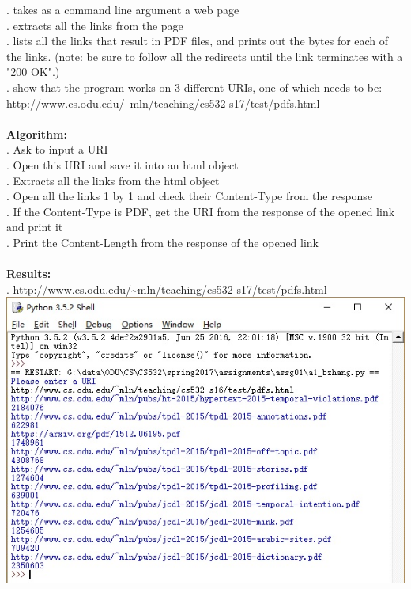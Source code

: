 \documentclass{article}
\begin{document}
		. takes as a command line argument a web page\\
		. extracts all the links from the page\\
		. lists all the links that result in PDF files, and prints out the bytes for each of the links.  (note: be sure to follow all the redirects until the link terminates with a "200 OK".)\\
		. show that the program works on 3 different URIs, one of which needs to be:\\
		\indent http://www.cs.odu.edu/~mln/teaching/cs532-s17/test/pdfs.html\\\\
		\textbf{Algorithm:}\\
		. Ask to input a URI\\
		. Open this URI and save it into an html object\\
		. Extracts all the links from the html object\\
		. Open all the links 1 by 1 and check their Content-Type from the response\\
		. If the Content-Type is PDF, get the URI from the response of the opened link and print it\\
		. Print the Content-Length from the response of the opened link\\\\
		\textbf{Results:}\\
		. http://www.cs.odu.edu/\~{}mln/teaching/cs532-s17/test/pdfs.html\\
		\includegraphics[width=1\textwidth]{result1.jpg}\\\\
\end{document}
